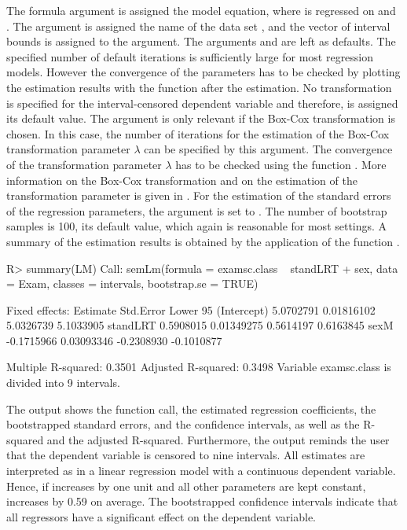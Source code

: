 The formula argument is assigned the model equation, where  is regressed on  and . The argument  is assigned the name of the data set , and the vector of interval bounds  is assigned to the  argument. The arguments  and  are left as defaults. The specified number of default iterations is sufficiently large for most regression models. However the convergence of the parameters has to be checked by plotting the estimation results with the function  after the estimation. No transformation is specified  for the interval-censored dependent variable and therefore,  is assigned its default value. The argument  is only relevant if the Box-Cox transformation  is chosen. In this case, the number of iterations for the estimation of the Box-Cox transformation parameter \(\lambda\) can be specified by this argument. The convergence of the transformation parameter \(\lambda \) has to be checked using the function . More information on the Box-Cox transformation and on the estimation of the transformation parameter is given in \citet{Wal19}. For the estimation of the standard errors of the regression parameters, the argument  is set to . The number of bootstrap samples  is 100, its default value, which again is reasonable for most settings. A summary of the estimation results is obtained by the application of the function .

\begin{example}
R> summary(LM)
Call:
semLm(formula = examsc.class ~ standLRT + sex, data = Exam,
     classes = intervals, bootstrap.se = TRUE)

Fixed effects:
             Estimate  Std.Error Lower 95%
(Intercept) 5.0702791 0.01816102       5.0326739       5.1033905
standLRT    0.5908015 0.01349275       0.5614197       0.6163845
sexM       -0.1715966 0.03093346      -0.2308930      -0.1010877

Multiple R-squared: 0.3501  Adjusted R-squared: 0.3498
Variable examsc.class is divided into 9 intervals.
\end{example}

The output shows the function call, the estimated regression coefficients, the bootstrapped standard errors, and the confidence intervals, as well as the R-squared and the adjusted R-squared. Furthermore, the output reminds the user that the dependent variable is censored to nine intervals. All estimates are interpreted as in a linear regression model with a continuous dependent variable. Hence, if  increases by one unit and all other parameters are kept constant,  increases by 0.59 on average. The bootstrapped confidence intervals indicate that all regressors have a significant effect on the dependent variable.



